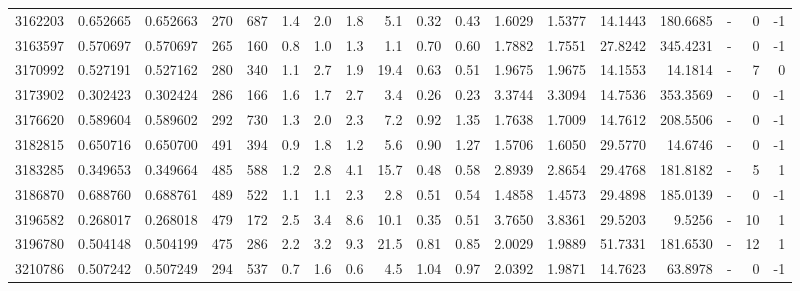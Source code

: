 \begin{tabular}{rrrrrrrrrrrrrrrlrr}
   3162203 & 0.652665 &   0.652663 &  270 &  687 &      1.4 &      2.0 &     1.8 &      5.1 &       0.32 &        0.43 &  1.6029 &  1.5377 &   14.1443 &  180.6685 &             - &        0 &         -1 \\
   3163597 & 0.570697 &   0.570697 &  265 &  160 &      0.8 &      1.0 &     1.3 &      1.1 &       0.70 &        0.60 &  1.7882 &  1.7551 &   27.8242 &  345.4231 &             - &        0 &         -1 \\
   3170992 & 0.527191 &   0.527162 &  280 &  340 &      1.1 &      2.7 &     1.9 &     19.4 &       0.63 &        0.51 &  1.9675 &  1.9675 &   14.1553 &   14.1814 &             - &        7 &          0 \\
   3173902 & 0.302423 &   0.302424 &  286 &  166 &      1.6 &      1.7 &     2.7 &      3.4 &       0.26 &        0.23 &  3.3744 &  3.3094 &   14.7536 &  353.3569 &             - &        0 &         -1 \\
   3176620 & 0.589604 &   0.589602 &  292 &  730 &      1.3 &      2.0 &     2.3 &      7.2 &       0.92 &        1.35 &  1.7638 &  1.7009 &   14.7612 &  208.5506 &             - &        0 &         -1 \\
   3182815 & 0.650716 &   0.650700 &  491 &  394 &      0.9 &      1.8 &     1.2 &      5.6 &       0.90 &        1.27 &  1.5706 &  1.6050 &   29.5770 &   14.6746 &             - &        0 &         -1 \\
   3183285 & 0.349653 &   0.349664 &  485 &  588 &      1.2 &      2.8 &     4.1 &     15.7 &       0.48 &        0.58 &  2.8939 &  2.8654 &   29.4768 &  181.8182 &             - &        5 &          1 \\
   3186870 & 0.688760 &   0.688761 &  489 &  522 &      1.1 &      1.1 &     2.3 &      2.8 &       0.51 &        0.54 &  1.4858 &  1.4573 &   29.4898 &  185.0139 &             - &        0 &         -1 \\
   3196582 & 0.268017 &   0.268018 &  479 &  172 &      2.5 &      3.4 &     8.6 &     10.1 &       0.35 &        0.51 &  3.7650 &  3.8361 &   29.5203 &    9.5256 &             - &       10 &          1 \\
   3196780 & 0.504148 &   0.504199 &  475 &  286 &      2.2 &      3.2 &     9.3 &     21.5 &       0.81 &        0.85 &  2.0029 &  1.9889 &   51.7331 &  181.6530 &             - &       12 &          1 \\
   3210786 & 0.507242 &   0.507249 &  294 &  537 &      0.7 &      1.6 &     0.6 &      4.5 &       1.04 &        0.97 &  2.0392 &  1.9871 &   14.7623 &   63.8978 &             - &        0 &         -1 \\

\end{tabular}
